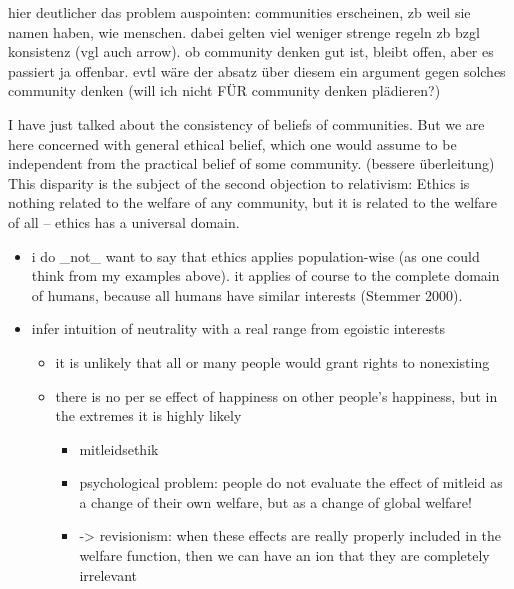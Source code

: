 hier deutlicher das problem auspointen: communities erscheinen, zb weil sie namen haben, wie menschen. dabei gelten viel weniger strenge regeln zb bzgl konsistenz (vgl auch arrow). ob community denken gut ist, bleibt offen, aber es passiert ja offenbar. evtl wäre der absatz über diesem ein argument gegen solches community denken (will ich nicht FÜR community denken plädieren?) 

I have just talked about the consistency of beliefs of communities. But we are here concerned with general ethical belief, which one would assume to be independent from the practical belief of some community. (bessere überleitung) This disparity is the subject of the second objection to relativism: Ethics is nothing related to the welfare of any community, but it is related to the welfare of all – ethics has a universal domain. 

\begin{itemize} \item i do \_not\_ want to say that ethics applies population-wise (as one could think from my examples above). it applies of course to the complete domain of humans, because all humans have similar interests (\label{ref:RNDitrDlHBuIn}Stemmer 2000). \item infer intuition of neutrality with a real range from egoistic interests 

\begin{itemize} \item it is unlikely that all or many people would grant rights to nonexisting \item there is no per se effect of happiness on other people’s happiness, but in the extremes it is highly likely 

\begin{itemize} \item mitleidsethik \item psychological problem: people do not evaluate the effect of mitleid as a change of their own welfare, but as a change of global welfare!  \item {}-{\textgreater} revisionism: when these effects are really properly included in the welfare function, then we can have an ion that they are completely irrelevant \end{itemize} \end{itemize} \end{itemize}